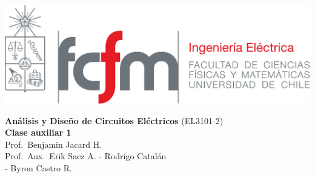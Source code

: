 \documentclass[
  11pt,
  letterpaper,
   addpoints,
   answers
  ]{exam}
\begin{document}
\noindent
\begin{minipage}{0.47\textwidth}
\includegraphics[width=\textwidth]{../fcfm_die}
\end{minipage}
\begin{minipage}{0.53\textwidth}
\begin{center} 
\large\textbf{Análisis y Diseño de Circuitos Eléctricos} (EL3101-2) \\
\large\textbf{Clase auxiliar 1} \\
\normalsize Prof.~Benjamin Jacard H.\\
\normalsize Prof.~Aux.~Erik Saez A. - Rodrigo Catalán\\
             - Byron Castro R.
\end{center}
\end{minipage}

\vspace{0.5cm}
\noindent
\vspace{.85cm}
\end{document}
